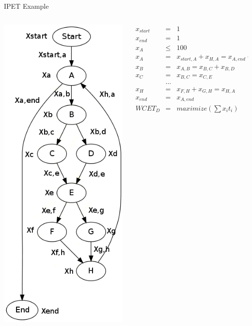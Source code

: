 \documentclass{beamer}
\begin{document}
\begin{frame}{IPET Example}
  \begin{columns}
    \begin{column}{0.25\textwidth}
      \includegraphics[scale=0.3]{ipetoutput.png}
    \end{column}
    \begin{column}{0.75\textwidth}
      \begin{eqnarray*}
        x_{start} &=& 1 \\
        x_{end} &=& 1 \\
        x_A &\leq& 100 \\
        x_A &=& x_{start,A} + x_{H,A} = x_{A,end} + x_{A,B} \\
        x_B &=& x_{A,B} = x_{B,C} + x_{B,D} \\
        x_C &=& x_{B,C} = x_{C,E} \\
        &\dots& \\
        x_H &=& x_{F,H} + x_{G,H} = x_{H,A} \\
        x_{end} &=& x_{A,end} \\
        WCET_D &=& maximize(\sum x_it_i)
      \end{eqnarray*}
    \end{column}
  \end{columns}
\end{frame}
\end{document}
